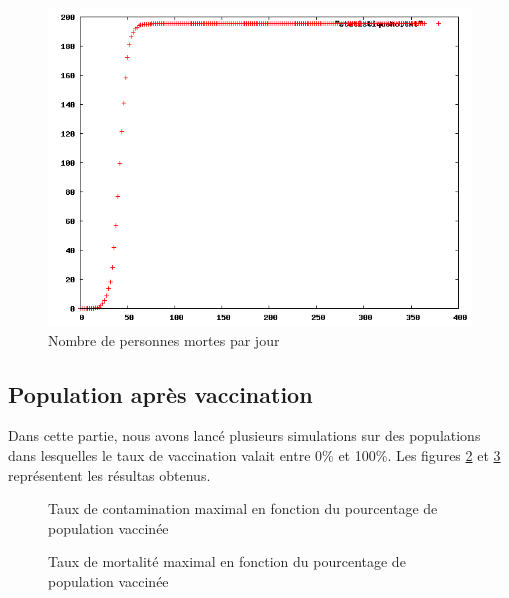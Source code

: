 \documentclass[12pt,a4paper,titlepage]{report}
\begin{document}
\begin{figure}[h]
  \centering
  \includegraphics[width=15cm]{1-1-statistiqueMo.png}
  \caption{Nombre de personnes mortes par jour}
  \label{fig:1-1-nb-morts}
\end{figure}

\subsection*{Population après vaccination}
Dans cette partie, nous avons lancé plusieurs simulations sur des populations dans 
lesquelles  le taux de vaccination valait entre 0\% et 100\%. Les figures  \ref{fig:1-2-nb-malades} 
et \ref{fig:1-2-nb-morts} représentent les résultas obtenus.

\begin{figure}[h]
  \centering
  \caption{Taux de contamination maximal en fonction du pourcentage de population vaccinée}
  \label{fig:1-2-nb-malades}
\end{figure}

 \begin{figure}[h]
  \centering
  \caption{Taux de mortalité maximal en fonction du pourcentage de population vaccinée}
  \label{fig:1-2-nb-morts}
\end{figure}



\end{document}
